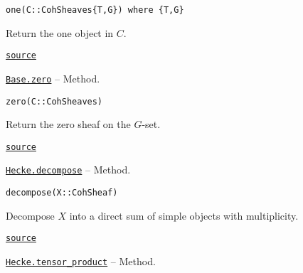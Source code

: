\documentclass{memoir}
\begin{document}
\begin{adjustwidth}{2em}{0pt}


\begin{verbatim}
one(C::CohSheaves{T,G}) where {T,G}
\end{verbatim}

Return the one object in \(C\).



\href{https://github.com/FabianMaeurer/JuCat.jl/blob/367390e2d003deec2ababa73caeab405e934bb35/src/structures/ConvolutionCategory/CoherentSheaves.jl#L196-L200}{\texttt{source}}


\end{adjustwidth}
\hypertarget{9779985997723116531}{} 
\hyperlink{9779985997723116531}{\texttt{Base.zero}}  -- {Method.}

\begin{adjustwidth}{2em}{0pt}


\begin{verbatim}
zero(C::CohSheaves)
\end{verbatim}

Return the zero sheaf on the \(G\)-set.



\href{https://github.com/FabianMaeurer/JuCat.jl/blob/367390e2d003deec2ababa73caeab405e934bb35/src/structures/ConvolutionCategory/CoherentSheaves.jl#L77-L81}{\texttt{source}}


\end{adjustwidth}
\hypertarget{4292008897843854263}{} 
\hyperlink{4292008897843854263}{\texttt{Hecke.decompose}}  -- {Method.}

\begin{adjustwidth}{2em}{0pt}


\begin{verbatim}
decompose(X::CohSheaf)
\end{verbatim}

Decompose \(X\) into a direct sum of simple objects with multiplicity.



\href{https://github.com/FabianMaeurer/JuCat.jl/blob/367390e2d003deec2ababa73caeab405e934bb35/src/structures/ConvolutionCategory/CoherentSheaves.jl#L250-L254}{\texttt{source}}


\end{adjustwidth}
\hypertarget{6020448135502085852}{} 
\hyperlink{6020448135502085852}{\texttt{Hecke.tensor\_product}}  -- {Method.}
\end{document}
